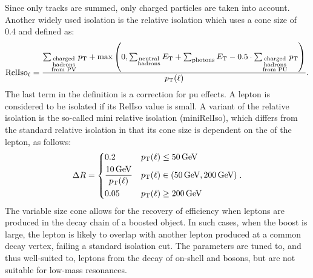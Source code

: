 Since only tracks are summed, only charged particles are taken into account. Another widely used isolation is the relative isolation which uses a cone size of 0.4 and defined as:
\begin{equation}
\text{RelIso}_\ell = \frac{ \sum_{\substack{\text{charged}\\\text{hadrons}\\\text{from PV}}}p_{\mathrm{T}} + \max\left(0, \sum_{\substack{\text{neutral}\\\text{hadrons}}}E_{\mathrm{T}} + \sum_{\text{photons}}E_{\mathrm{T}} - 0.5\cdot \sum_{\substack{\text{charged}\\\text{hadrons}\\\text{from PU}}}p_{\mathrm{T}} \right) }{ p_{\mathrm{T}}(\ell) }.
\end{equation}
The last term in the definition is a correction for \gls{pu} effects. A lepton is considered to be isolated if its RelIso value is small. A variant of the relative isolation is the so-called mini relative isolation (miniRelIso), which differs from the standard relative isolation in that its cone size is dependent on the \pt of the lepton, as follows:
\begin{equation}
\Delta R = 
\begin{dcases}
0.2 & p_{\mathrm{T}}(\ell)\leq 50\,\text{Ge\hspace{-.08em}V} \\
\frac{10\,\text{Ge\hspace{-.08em}V}}{p_{\mathrm{T}}(\ell)} & p_{\mathrm{T}}(\ell) \in (50\,\text{Ge\hspace{-.08em}V} , 200\,\text{Ge\hspace{-.08em}V}) \\
0.05 & p_{\mathrm{T}}(\ell)\geq 200\,\text{Ge\hspace{-.08em}V}
\end{dcases}.
\end{equation}
The variable size cone allows for the recovery of efficiency when leptons are produced in the decay chain of a boosted object. In such cases, when the boost is large, the lepton is likely to overlap with another lepton produced at a common decay vertex, failing a standard isolation cut. The parameters are tuned to, and thus well-suited to, leptons from the decay of on-shell \PW and \PZ bosons, but are not suitable for low-mass resonances. 

